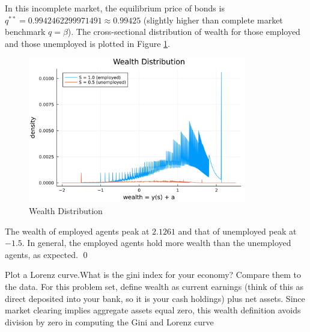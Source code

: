 \begin{solution}
    In this incomplete market, the equilibrium price of bonds is $q^{**} = 0.9942462299971491 \approx 0.99425$
    (slightly higher than complete market benchmark $q = \beta$). The cross-sectional distribution of wealth for
    those employed and those unemployed is plotted in Figure \ref{fig:wealth}.
    \begin{figure}[H]
        \centering
        \includegraphics[width=0.85\textwidth, angle=0]
        {3 Wealth_Distributions.png}
        \caption{Wealth Distribution}
        \label{fig:wealth}
    \end{figure}
    \begin{remark}
        The wealth of employed agents peak at $2.1261$
        and that of unemployed peak at $-1.5$. In general, the employed agents hold more wealth
        than the unemployed agents, as expected. \qed
    \end{remark}
\end{solution}

\newpage
\begin{framedexercise}
    Plot a Lorenz curve.What is the gini index for your economy? Compare
    them to the data. For this problem set, define wealth as current earnings (think
    of this as direct deposited into your bank, so it is your cash holdings) plus net
    assets. Since market clearing implies aggregate assets equal zero, this wealth
    definition avoids division by zero in computing the Gini and Lorenz curve
\end{framedexercise}

